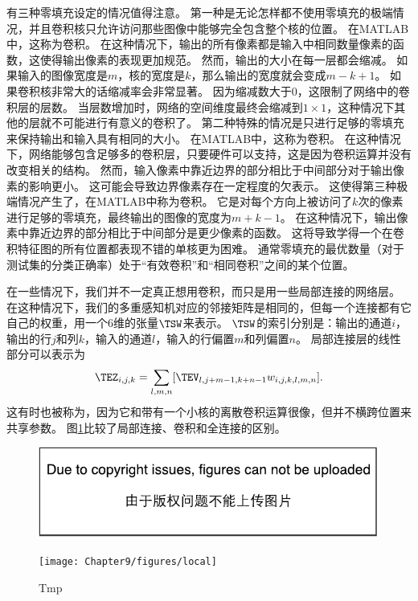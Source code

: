 有三种零填充设定的情况值得注意。
第一种是无论怎样都不使用零填充的极端情况，并且卷积核只允许访问那些图像中能够完全包含整个核的位置。
在MATLAB中，这称为卷积。
在这种情况下，输出的所有像素都是输入中相同数量像素的函数，这使得输出像素的表现更加规范。
然而，输出的大小在每一层都会缩减。
如果输入的图像宽度是$m$，核的宽度是$k$，那么输出的宽度就会变成$m-k+1$。
如果卷积核非常大的话缩减率会非常显著。
因为缩减数大于0，这限制了网络中的卷积层的层数。
当层数增加时，网络的空间维度最终会缩减到$1\times 1$，这种情况下其他的层就不可能进行有意义的卷积了。
第二种特殊的情况是只进行足够的零填充来保持输出和输入具有相同的大小。
在MATLAB中，这称为卷积。
在这种情况下，网络能够包含足够多的卷积层，只要硬件可以支持，这是因为卷积运算并没有改变相关的结构。
然而，输入像素中靠近边界的部分相比于中间部分对于输出像素的影响更小。
这可能会导致边界像素存在一定程度的欠表示。
这使得第三种极端情况产生了，在MATLAB中称为卷积。
它是对每个方向上被访问了$k$次的像素进行足够的零填充，最终输出的图像的宽度为$m+k-1$。
在这种情况下，输出像素中靠近边界的部分相比于中间部分是更少像素的函数。
这将导致学得一个在卷积特征图的所有位置都表现不错的单核更为困难。
通常零填充的最优数量（对于测试集的分类正确率）处于``有效卷积''和``相同卷积''之间的某个位置。

 

在一些情况下，我们并不一定真正想用卷积，而只是用一些局部连接的网络层\citep{LeCun86,LeCun89a}。
在这种情况下，我们的多重感知机对应的邻接矩阵是相同的，但每一个连接都有它自己的权重，用一个6维的张量$\TSW$来表示。
$\TSW$的索引分别是：输出的通道$i$，输出的行$j$和列$k$，输入的通道$l$，输入的行偏置$m$和列偏置$n$。
局部连接层的线性部分可以表示为
\begin{equation}
\TEZ_{i,j,k} = \sum_{l,m,n} [\TEV_{l, j+m-1, k+n-1} w_{i, j, k, l, m, n}].
\end{equation}
这有时也被称为，因为它和带有一个小核的离散卷积运算很像，但并不横跨位置来共享参数。
图\ref{fig:chap9_local}比较了局部连接、卷积和全连接的区别。
\begin{figure}[!htb]
\ifOpenSource
\centerline{\includegraphics{figure.pdf}}
\else
\centerline{\texttt{[image: Chapter9/figures/local]}}
\fi
\caption{Tmp}
\label{fig:chap9_local}
\end{figure}
 
